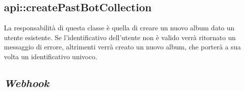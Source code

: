 \subsection{api::createPastBotCollection}

La responsabilità di questa classe è quella di creare un nuovo album dato un
utente esistente. Se l'identificativo dell'utente non è valido verrà ritornato
un messaggio di errore, altrimenti verrà creato un nuovo album, che porterà a
sua volta un identificativo univoco.

\subsection{\textit{Webhook}}
